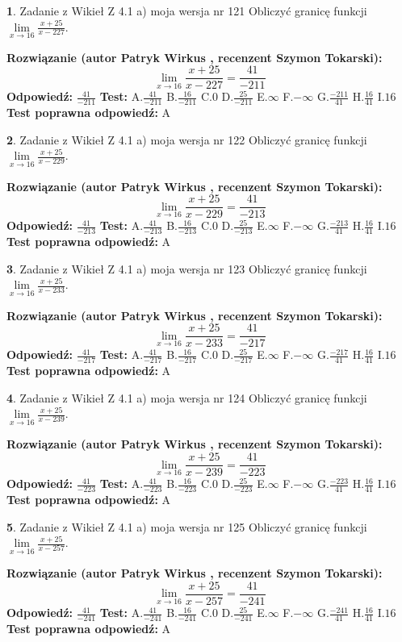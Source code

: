 \documentclass[12pt, a4paper]{article}
\theoremstyle{definition} %
\newtheorem{zad}{}
\newcommand{\zadStart}[1]{\begin{zad}#1\newline}
\newcommand{\zadStop}{\end{zad}}
\newcommand{\rozwStart}[2]{\noindent \textbf{Rozwiązanie (autor #1 , recenzent #2): }\newline}
\newcommand{\rozwStop}{\newline}
\newcommand{\odpStart}{\noindent \textbf{Odpowiedź:}\newline}
\newcommand{\odpStop}{\newline}
\newcommand{\testStart}{\noindent \textbf{Test:}\newline}
\newcommand{\testStop}{\newline}
\newcommand{\kluczStart}{\noindent \textbf{Test poprawna odpowiedź:}\newline}
\newcommand{\kluczStop}{\newline}
\begin{document}
\zadStart{Zadanie z Wikieł Z 4.1 a) moja wersja nr 121}
Obliczyć granicę funkcji $\lim\limits_{x\to16}\frac{x+25}{x-227}$.
\zadStop
\rozwStart{Patryk Wirkus}{Szymon Tokarski}
$$\lim\limits_{x\to16}\frac{x+25}{x-227} = \frac{41}{-211}$$
\rozwStop
\odpStart
$\frac{41}{-211}$
\odpStop
\testStart
A.$\frac{41}{-211}$
B.$\frac{16}{-211}$
C.$0$
D.$\frac{25}{-211}$
E.$\infty$
F.$-\infty$
G.$\frac{-211}{41}$
H.$\frac{16}{41}$
I.$16$
\testStop
\kluczStart
A
\kluczStop



\zadStart{Zadanie z Wikieł Z 4.1 a) moja wersja nr 122}
Obliczyć granicę funkcji $\lim\limits_{x\to16}\frac{x+25}{x-229}$.
\zadStop
\rozwStart{Patryk Wirkus}{Szymon Tokarski}
$$\lim\limits_{x\to16}\frac{x+25}{x-229} = \frac{41}{-213}$$
\rozwStop
\odpStart
$\frac{41}{-213}$
\odpStop
\testStart
A.$\frac{41}{-213}$
B.$\frac{16}{-213}$
C.$0$
D.$\frac{25}{-213}$
E.$\infty$
F.$-\infty$
G.$\frac{-213}{41}$
H.$\frac{16}{41}$
I.$16$
\testStop
\kluczStart
A
\kluczStop



\zadStart{Zadanie z Wikieł Z 4.1 a) moja wersja nr 123}
Obliczyć granicę funkcji $\lim\limits_{x\to16}\frac{x+25}{x-233}$.
\zadStop
\rozwStart{Patryk Wirkus}{Szymon Tokarski}
$$\lim\limits_{x\to16}\frac{x+25}{x-233} = \frac{41}{-217}$$
\rozwStop
\odpStart
$\frac{41}{-217}$
\odpStop
\testStart
A.$\frac{41}{-217}$
B.$\frac{16}{-217}$
C.$0$
D.$\frac{25}{-217}$
E.$\infty$
F.$-\infty$
G.$\frac{-217}{41}$
H.$\frac{16}{41}$
I.$16$
\testStop
\kluczStart
A
\kluczStop



\zadStart{Zadanie z Wikieł Z 4.1 a) moja wersja nr 124}
Obliczyć granicę funkcji $\lim\limits_{x\to16}\frac{x+25}{x-239}$.
\zadStop
\rozwStart{Patryk Wirkus}{Szymon Tokarski}
$$\lim\limits_{x\to16}\frac{x+25}{x-239} = \frac{41}{-223}$$
\rozwStop
\odpStart
$\frac{41}{-223}$
\odpStop
\testStart
A.$\frac{41}{-223}$
B.$\frac{16}{-223}$
C.$0$
D.$\frac{25}{-223}$
E.$\infty$
F.$-\infty$
G.$\frac{-223}{41}$
H.$\frac{16}{41}$
I.$16$
\testStop
\kluczStart
A
\kluczStop



\zadStart{Zadanie z Wikieł Z 4.1 a) moja wersja nr 125}
Obliczyć granicę funkcji $\lim\limits_{x\to16}\frac{x+25}{x-257}$.
\zadStop
\rozwStart{Patryk Wirkus}{Szymon Tokarski}
$$\lim\limits_{x\to16}\frac{x+25}{x-257} = \frac{41}{-241}$$
\rozwStop
\odpStart
$\frac{41}{-241}$
\odpStop
\testStart
A.$\frac{41}{-241}$
B.$\frac{16}{-241}$
C.$0$
D.$\frac{25}{-241}$
E.$\infty$
F.$-\infty$
G.$\frac{-241}{41}$
H.$\frac{16}{41}$
I.$16$
\testStop
\kluczStart
A
\kluczStop
\end{document}
